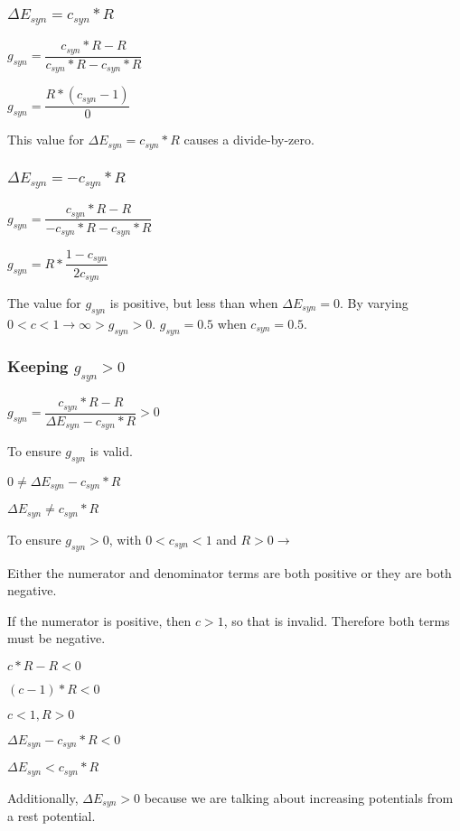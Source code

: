 \subsubsection{$\Delta E_{syn} = c_{syn} * R$}

$g_{syn} = \dfrac{c_{syn} * R - R}{c_{syn} * R - c_{syn} * R}$

$g_{syn} = \dfrac{R * (c_{syn} - 1)}{0}$

This value for $\Delta E_{syn} = c_{syn} * R$ causes a divide-by-zero.

\subsubsection{$\Delta E_{syn} = -c_{syn} * R$}

$g_{syn} = \dfrac{c_{syn} * R - R}{-c_{syn} * R - c_{syn} * R}$

$g_{syn} = R * \dfrac{1 - c_{syn}}{2 c_{syn}}$

The value for $g_{syn}$ is positive, but less than when $\Delta E_{syn} = 0$.
By varying $0 < c < 1 \rightarrow \infty > g_{syn} > 0$. $g_{syn} = 0.5$ when $c_{syn} = 0.5$.

\subsubsection{Keeping $g_{syn} > 0$}

$g_{syn} = \dfrac{c_{syn} * R - R}{\Delta E_{syn} - c_{syn} * R} > 0$

To ensure $g_{syn}$ is valid.

$0 \neq \Delta E_{syn} - c_{syn} * R$

$\Delta E_{syn} \neq c_{syn} * R$

To ensure $g_{syn} > 0$, with $0 < c_{syn} < 1$ and $R > 0 \rightarrow$

Either the numerator and denominator terms are both positive or they are both negative.

If the numerator is positive, then $c > 1$, so that is invalid. Therefore both terms must be negative.

$c*R - R < 0$

$(c - 1) * R < 0$

$c < 1, R > 0$

$\Delta E_{syn} - c_{syn} * R < 0$

$\Delta E_{syn} < c_{syn} * R$

Additionally, $\Delta E_{syn} > 0$ because we are talking about increasing potentials from a rest potential.


